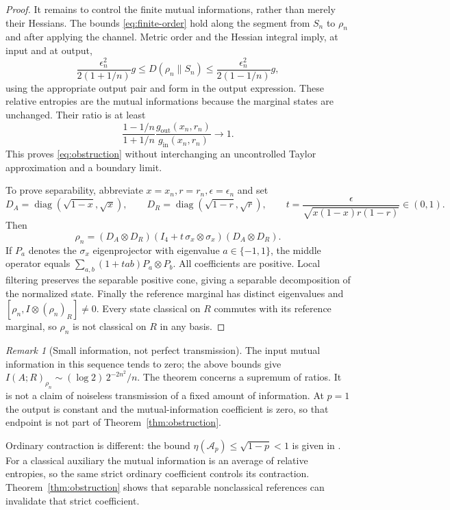 \documentclass[11pt,a4paper]{article}
\theoremstyle{remark}\newtheorem{remark}[theorem]{Remark}
\newcommand{\cA}{\mathcal A}
\begin{document}
\begin{proof}
It remains to control the finite mutual informations, rather than merely
their Hessians.
The bounds \eqref{eq:finite-order} hold along the segment from $S_n$ to
$\rho_n$ and after applying the channel.
Metric order and the Hessian integral imply, at input and at output,
\[
 \frac{\epsilon_n^2}{2(1+1/n)}g
 \leq D(\rho_n\|S_n)
 \leq\frac{\epsilon_n^2}{2(1-1/n)}g,
\]
using the appropriate output pair and form in the output expression.
These relative entropies are the mutual informations because the marginal
states are unchanged. Their ratio is at least
\[
 \frac{1-1/n}{1+1/n}
 \frac{g_{\mathrm{out}}(x_n,r_n)}{g_{\mathrm{in}}(x_n,r_n)}
 \longrightarrow1.
\]
This proves \eqref{eq:obstruction} without interchanging an uncontrolled
Taylor approximation and a boundary limit.

To prove separability, abbreviate $x=x_n,r=r_n,\epsilon=\epsilon_n$ and set
\[
 D_A=\operatorname{diag}(\sqrt{1-x},\sqrt x),\qquad
 D_R=\operatorname{diag}(\sqrt{1-r},\sqrt r),\qquad
 t=\frac{\epsilon}{\sqrt{x(1-x)r(1-r)}}\in(0,1).
\]
Then
\[
 \rho_n=(D_A\otimes D_R)(I_4+t\,\sigma_x\otimes\sigma_x)(D_A\otimes D_R).
\]
If $P_a$ denotes the $\sigma_x$ eigenprojector with eigenvalue $a\in\{-1,1\}$,
the middle operator equals
$\sum_{a,b}(1+tab)P_a\otimes P_b$.
All coefficients are positive. Local filtering preserves the separable
positive cone, giving a separable decomposition of the normalized state.
Finally the reference marginal has distinct eigenvalues and
$[\rho_n,I\otimes(\rho_n)_R]\neq0$.
Every state classical on $R$ commutes with its reference marginal, so
$\rho_n$ is not classical on $R$ in any basis.
\end{proof}

\begin{remark}[Small information, not perfect transmission]
The input mutual information in this sequence tends to zero; the above
bounds give
$I(A;R)_{\rho_n}\sim(\log2)\,2^{-2n^2}/n$.
The theorem concerns a supremum of ratios. It is not a claim of noiseless
transmission of a fixed amount of information.
At $p=1$ the output is constant and the mutual-information coefficient is
zero, so that endpoint is not part of Theorem~\ref{thm:obstruction}.
\end{remark}

Ordinary contraction is different: the bound
$\eta(\cA_p)\leq\sqrt{1-p}<1$ is given in
\cite[Lemma~6.3]{bgsw}.
For a classical auxiliary the mutual information is an average of relative
entropies, so the same strict ordinary coefficient controls its contraction.
Theorem~\ref{thm:obstruction} shows that separable nonclassical references
can invalidate that strict coefficient.
\end{document}
